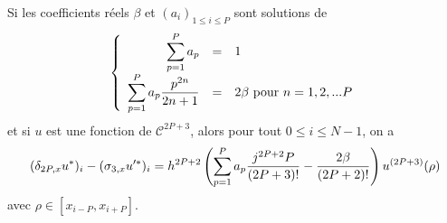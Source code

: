 \begin{theoreme}
Si les coefficients réels $\beta$ et $(a_i)_{1 \leq i \leq P}$ sont solutions de 
\begin{equation}
\left\lbrace
\begin{array}{rcl}
\displaystyle\sum\limits_{p=1}^P a_p & = & 1 \\
\displaystyle\sum\limits_{p=1}^P a_p \dfrac{p^{2n}}{2n+1} & = & 2 \beta  \text{ pour } n=1,2,...P
\end{array}
\right.
\label{eq:hermitian_system}
\end{equation}
et si $u$ est une fonction de $\mathcal{C}^{2P+3}$, alors pour tout $0 \leq i \leq N-1$, on a 
\begin{equation}
(\delta_{2P,x} u^*)_i - (\sigma_{3,x} u'^*)_i = \\
h^{2P+2} \left( \displaystyle\sum\limits_{p=1}^P a_p  \dfrac{j^{2P+2} P}{(2P+3)!}  - \dfrac{2\beta}{(2P+2)!}   \right)u^{(2P+3)}(\rho)
\label{eq:eq_cons}
\end{equation}
avec $\rho \in [x_{i-P}, x_{i+P}]$.
\end{theoreme}

